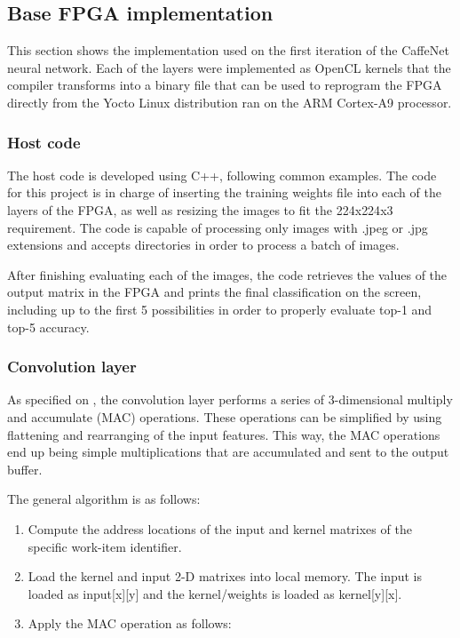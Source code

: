 \begin{enumerate}
\subsection{Base FPGA implementation}

This section shows the implementation used on the first iteration of the CaffeNet neural network.
Each of the layers were implemented as OpenCL kernels that the compiler transforms into a binary
file that can be used to reprogram the FPGA directly from the Yocto Linux distribution ran
on the ARM Cortex-A9 processor.

\subsubsection{Host code}

The host code is developed using C++, following common \intelOCL examples. The code for this
project is in charge of inserting the training weights file into each of the layers of the
FPGA, as well as resizing the images to fit the 224{x}224{x}3 requirement. The code is capable
of processing only images with .jpeg or .jpg extensions and accepts directories in order to
process a batch of images.

After finishing evaluating each of the images, the code retrieves the values of the output 
matrix in the FPGA and prints the final classification on the screen, including up to the first 
5 possibilities in order to properly evaluate top-1 and top-5 accuracy.

\subsubsection{Convolution layer}

As specified on \cite{suda}, the convolution layer performs a series of 3-dimensional multiply and accumulate (MAC)
operations. These operations can be simplified by using flattening and rearranging of the input features. This way,
the MAC operations end up being simple multiplications that are accumulated and sent to the output buffer.

The general algorithm is as follows:
\begin{enumerate}
    \item Compute the address locations of the input and kernel matrixes
    of the specific work-item identifier.
    \item Load the kernel and input 2-D matrixes into local memory. The input is loaded
    as input[x][y] and the kernel/weights is loaded as kernel[y][x].
    \item Apply the MAC operation as follows: 
    

\end{enumerate}
\end{enumerate}
